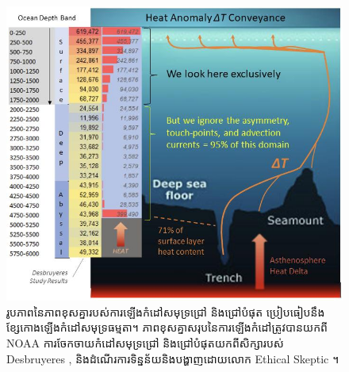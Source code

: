 \documentclass[10pt,twocolumn,letterpaper]{article}
\begin{document}
\begin{figure}[t]
\begin{center}
\includegraphics[width=1\textwidth]{deepsea.jpg}
\end{center}
   \caption{រូបភាពនៃភាពខុសគ្នា​របស់ការឡើងកំដៅសមុទ្រជ្រៅ និងជ្រៅបំផុត ប្រៀបធៀប​នឹងខ្សែកោងឡើងកំដៅសមុទ្រធម្មតា។ ភាពខុសគ្នាសរុបនៃការឡើងកំដៅត្រូវបានយកពី NOAA \cite{147} ការចែកចាយកំដៅសមុទ្រជ្រៅ និងជ្រៅបំផុតយកពីសិក្សា​របស់ Desbruyeres \cite{132}, និងដំណើរការទិន្នន័យនិងបង្ហាញដោយលោក Ethical Skeptic \cite{129}។}
\label{fig:21}
\end{figure}
\end{document}
